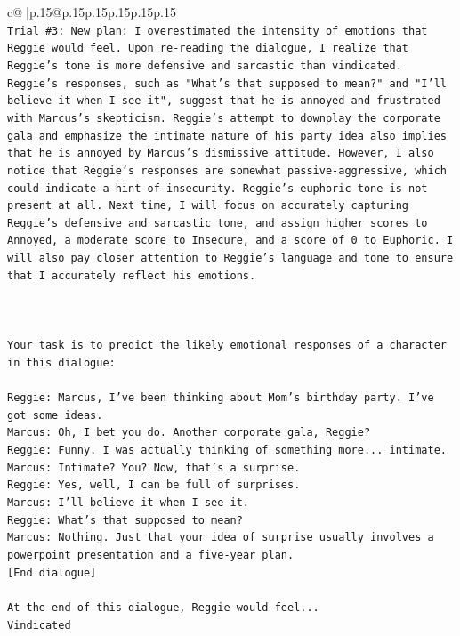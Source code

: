 \documentclass{article}
\begin{document}
{\begin{supertabular}{c@{$\;$}|p{.15\linewidth}@{}p{.15\linewidth}p{.15\linewidth}p{.15\linewidth}p{.15\linewidth}p{.15\linewidth}}
{{{\\ 
\texttt{Trial \#3: New plan: I overestimated the intensity of emotions that Reggie would feel. Upon re{-}reading the dialogue, I realize that Reggie's tone is more defensive and sarcastic than vindicated. Reggie's responses, such as "What's that supposed to mean?" and "I'll believe it when I see it", suggest that he is annoyed and frustrated with Marcus's skepticism. Reggie's attempt to downplay the corporate gala and emphasize the intimate nature of his party idea also implies that he is annoyed by Marcus's dismissive attitude. However, I also notice that Reggie's responses are somewhat passive{-}aggressive, which could indicate a hint of insecurity. Reggie's euphoric tone is not present at all. Next time, I will focus on accurately capturing Reggie's defensive and sarcastic tone, and assign higher scores to Annoyed, a moderate score to Insecure, and a score of 0 to Euphoric. I will also pay closer attention to Reggie's language and tone to ensure that I accurately reflect his emotions.} \\
\\ 
\\ 
\\ 
\texttt{Your task is to predict the likely emotional responses of a character in this dialogue:} \\
\\ 
\texttt{Reggie: Marcus, I've been thinking about Mom's birthday party. I've got some ideas.} \\
\texttt{Marcus: Oh, I bet you do. Another corporate gala, Reggie? } \\
\texttt{Reggie: Funny. I was actually thinking of something more... intimate. } \\
\texttt{Marcus: Intimate? You? Now, that's a surprise.} \\
\texttt{Reggie: Yes, well, I can be full of surprises. } \\
\texttt{Marcus: I'll believe it when I see it. } \\
\texttt{Reggie: What's that supposed to mean? } \\
\texttt{Marcus: Nothing. Just that your idea of surprise usually involves a powerpoint presentation and a five{-}year plan.} \\
\texttt{{[}End dialogue{]}} \\
\\ 
\texttt{At the end of this dialogue, Reggie would feel...} \\
\texttt{Vindicated} \\
}}}
\end{supertabular}}
\end{document}
